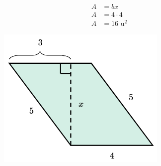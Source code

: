 \begin{solutionbox}{15cm}
\begin{minipage}{0.6\textwidth}
        \begin{align*}
            A & =bx             \\
            A & =4\cdot 4       \\
            A & =16 \text{ u}^2
        \end{align*}
    \end{minipage}\hfill
    \begin{minipage}{0.35\textwidth}
        \begin{figure}[H]
            \centering
            \includegraphics[width=0.9\linewidth]{../images/area_compuesta_04a.png}
            \caption{}
            \label{fig:area_compuesta_04a}
        \end{figure}
    \end{minipage}

\end{solutionbox}
